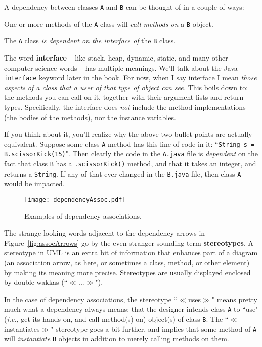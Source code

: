 A dependency between classes \texttt{A} and \texttt{B} can be thought of in a
couple of ways:

\begin{compactitem}
\item One or more methods of the \texttt{A} class will \textit{call methods
on} a \texttt{B} object.
\item The \texttt{A} class \textit{is dependent on the interface of} the
\texttt{B} class.
\end{compactitem}

The word \textbf{interface} -- like stack, heap, dynamic, static, and many
other computer science words -- has multiple meanings. We'll talk about the
Java \texttt{interface} keyword later in the book. For now, when I say
interface I mean \textit{those aspects of a class that a user of that type of
object can see.} This boils down to: the methods you can call on it, together
with their argument lists and return types. Specifically, the interface does
\textit{not} include the method implementations (the bodies of the methods),
nor the instance variables.

If you think about it, you'll realize why the above two bullet points are
actually equivalent. Suppose some class \texttt{A} method has this line of
code in it: ``\texttt{String s = B.scissorKick(15)}". Then clearly the code in
the \texttt{A.java} file is \textit{dependent} on the fact that class
\texttt{B} has a \texttt{.scissorKick()} method, and that it takes an integer,
and returns a \texttt{String}. If any of that ever changed in the
\texttt{B.java} file, then class \texttt{A} would be impacted.

\begin{figure}[ht]
\centering
\texttt{[image: dependencyAssoc.pdf]}   %
\caption{Examples of dependency associations.}
\label{fig:dependencyExamples}
\end{figure}

The strange-looking words adjacent to the dependency arrows in
Figure~\ref{fig:assocArrows} go by the even stranger-sounding term
\textbf{stereotypes}. A stereotype in UML is an extra bit of information that
enhances part of a diagram (an association arrow, as here, or sometimes a
class, method, or other element) by making its meaning more precise.
Stereotypes are usually displayed enclosed by double-wakkas
(``$\ll$...$\gg$").

In the case of dependency associations, the stereotype ``$\ll$uses$\gg$" means
pretty much what a dependency always means: that the designer intends class
\texttt{A} to ``use" (\textit{i.e.}, get its hands on, and call method(s) on)
object(s) of class \texttt{B}. The ``$\ll$instantiates$\gg$" stereotype goes a
bit further, and implies that some method of \texttt{A} will
\textit{instantiate} \texttt{B} objects in addition to merely calling methods
on them.

